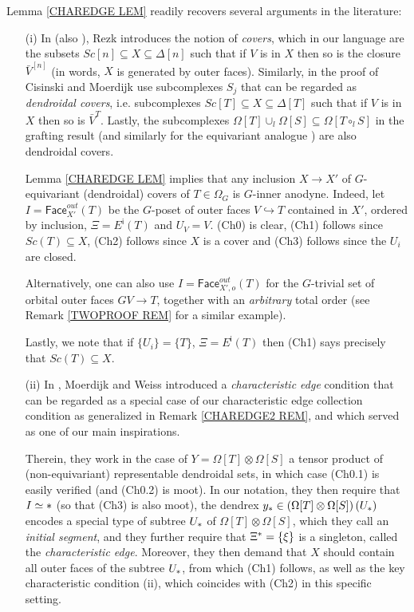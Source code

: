 \documentclass[a4paper,10pt,draft]{article}%
\begin{document}
\begin{remark} Lemma \ref{CHAREDGE LEM} readily recovers several arguments in the literature:
\begin{itemize}
\item[(i)] In \cite[\S 10]{Rez01} (also \cite[\S 6.2]{Rez10}), Rezk introduces the notion of \textit{covers}, which in our language are the subsets
$Sc[n] \subseteq X \subseteq \Delta[n]$
such that if $V$ is in $X$ then so is the closure $\bar{V}^{[n]}$
(in words, $X$ is generated by outer faces).
Similarly, in the proof of \cite[Prop. 2.4]{CM13a}
Cisinski and Moerdijk use subcomplexes $S_j$ that can be regarded as
\textit{dendroidal covers},
i.e. subcomplexes
$Sc[T] \subseteq X \subseteq \Delta[T]$
such that if $V$ is in $X$ then so is $\bar{V}^{T}$.
Lastly, the subcomplexes 
$\Omega[T] \cup_l \Omega[S] \subseteq \Omega[T \circ_l S]$
in the grafting result \cite[Lemma 5.2]{MW09} (and similarly for the equivariant analogue \cite[Prop. 6.19]{Per17}) are also dendroidal covers.

Lemma \ref{CHAREDGE LEM} implies
that any inclusion $X \to X'$ of $G$-equivariant (dendroidal) covers of $T\in \Omega_G$
is $G$-inner anodyne. 
Indeed, let $I=\mathsf{Face}_{X'}^{out}(T)$ be the $G$-poset of outer faces $V \hookrightarrow T$ contained in $X'$, ordered by inclusion, 
$\Xi = E^{\mathsf{i}}(T)$ and $U_V = V$.
(Ch0) is clear, (Ch1) follows since 
$Sc(T) \subseteq X$, (Ch2) follows since $X$ is a cover and
(Ch3) follows since the $U_i$ are closed.

Alternatively, one can also use $I=\mathsf{Face}_{X',o}^{out}(T)$
for the $G$-trivial set of orbital outer faces $GV \to T$,
together with an \textit{arbitrary} total order (see Remark \ref{TWOPROOF REM} for a similar example).

Lastly, we note that if $\{U_i\}=\{T\}$, $\Xi=E^{\mathsf{i}}(T)$
then (Ch1) says precisely that $Sc(T) \subseteq X$.


\item[(ii)] In \cite[Lemma 9.7]{MW09}, Moerdijk and Weiss introduced a \textit{characteristic edge} condition that can be regarded as a special case of our characteristic edge collection condition as generalized in Remark \ref{CHAREDGE2 REM}, and which served as one of our main inspirations.

Therein, they work in the case of $Y= \Omega[T] \otimes \Omega[S]$
a tensor product of (non-equivariant) representable dendroidal sets, in which case (Ch0.1) is easily verified (and (Ch0.2) is moot).
In our notation, they then require that $I \simeq \**$ (so that (Ch3) is also moot), 
the dendrex 
$y_{\**} \in \left(\Omega[T] \otimes \Omega[S]\right)(U_{\**})$ encodes a special type of subtree $U_{\**}$ of $\Omega[T] \otimes \Omega[S]$, which they call an \textit{initial segment},
and they further require that $\Xi^{\**} = \{\xi\}$ is a singleton, called the \textit{characteristic edge}.
Moreover, they then demand that $X$ should contain all outer faces of the subtree $U_{\**}$, from which (Ch1) follows, 
as well as the key characteristic condition 
\cite[Lemma 9.7]{MW09}(ii),
which coincides with (Ch2) in this specific setting.


\end{itemize}
\end{remark}
\end{document}
